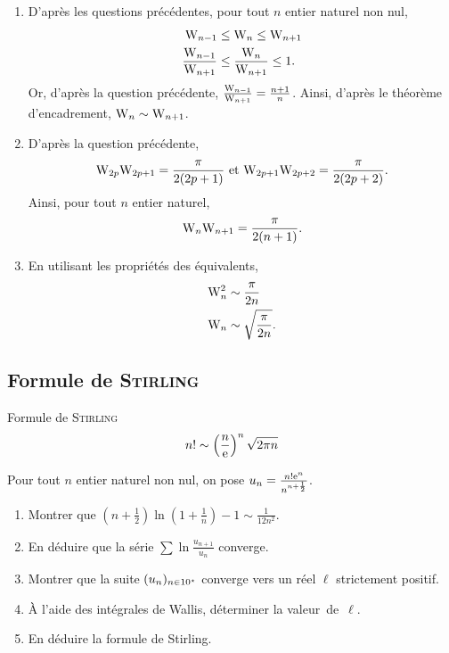 \begin{preuve}
\begin{enumerate}
\item D'après les questions précédentes, pour tout $n$ entier naturel non nul,
\begin{align*}
\mathrm{W}_{n-1} &\leq \mathrm{W}_n \leq \mathrm{W}_{n+1}\\
\frac{\mathrm{W}_{n-1}}{\mathrm{W}_{n+1}} &\leq \frac{\mathrm{W}_n}{\mathrm{W}_{n+1}} \leq 1.
\end{align*}
Or, d'après la question précédente, $\frac{\mathrm{W}_{n-1}}{\mathrm{W}_{n+1}} = \frac{n+1}{n}$. Ainsi, d'après le théorème d'encadrement, $\mathrm{W}_n \sim \mathrm{W}_{n+1}$.

\item D'après la question précédente,
\[
\mathrm{W}_{2p} \mathrm{W}_{2p+1} = \frac{\pi}{2 (2 p + 1)}
\text{ et }
\mathrm{W}_{2p+1} \mathrm{W}_{2p+2} = \frac{\pi}{2 (2p+2)}.
\]
Ainsi, pour tout $n$ entier naturel,
\[
\mathrm{W}_n \mathrm{W}_{n+1} = \frac{\pi}{2 (n + 1)}.
\]

\item En utilisant les propriétés des équivalents,
\begin{align*}
\mathrm{W}_n^2 &\sim \frac{\pi}{2 n}\\
\mathrm{W}_n &\sim \sqrt{\frac{\pi}{2 n}}.
\end{align*}
\end{enumerate}
\end{preuve}

\subsection{Formule de \textsc{Stirling}} \label{preuve_stirling}


\begin{theo}{Formule de \textsc{Stirling}}
    $$n! \sim \left(\frac{n}{\mathrm{e}}\right)^n \sqrt{2 \pi n}$$
\end{theo}

\begin{exercice}
Pour tout $n$ entier naturel non nul, on pose $u_n = \frac{n! \mathrm{e}^n}{n^{n + \frac{1}{2}}}$.
\begin{enumerate}
\item Montrer que $\left(n + \frac{1}{2}\right) \ln\left(1 + \frac{1}{n}\right) - 1\sim \frac{1}{12 n^2}$.

\item En déduire que la série $\sum \ln \frac{u_{n+1}}{u_n}$ converge.

\item Montrer que la suite $(u_n)_{n\in10^\star}$ converge vers un réel $\ell$ strictement positif.

\item À l'aide des intégrales de Wallis, déterminer la valeur~de~$\ell$.

\item En déduire la formule de Stirling.
\end{enumerate}
\end{exercice}

